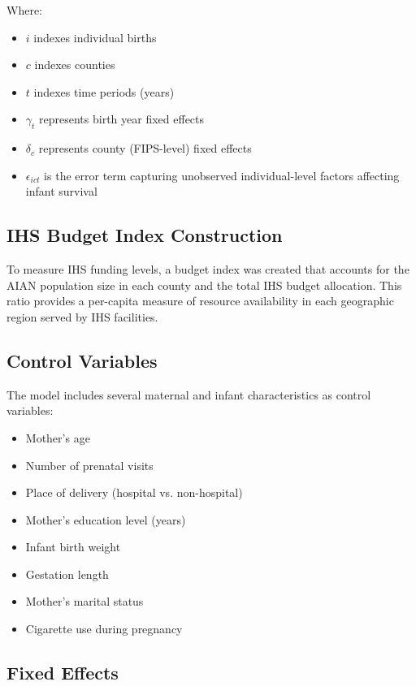 \documentclass[12pt]{article}
\begin{document}
Where:
\begin{itemize}
    \item $i$ indexes individual births
    \item $c$ indexes counties
    \item $t$ indexes time periods (years)
    \item $\gamma_t$ represents birth year fixed effects
    \item $\delta_c$ represents county (FIPS-level) fixed effects
    \item $\epsilon_{ict}$ is the error term capturing unobserved individual-level factors affecting infant survival
\end{itemize}

\subsection{IHS Budget Index Construction}

To measure IHS funding levels, a budget index was created that accounts for the AIAN population size in each county and the total IHS budget allocation. This ratio provides a per-capita measure of resource availability in each geographic region served by IHS facilities.

\subsection{Control Variables}

The model includes several maternal and infant characteristics as control variables:
\begin{itemize}
    \item Mother's age
    \item Number of prenatal visits
    \item Place of delivery (hospital vs. non-hospital)
    \item Mother's education level (years)
    \item Infant birth weight
    \item Gestation length
    \item Mother's marital status
    \item Cigarette use during pregnancy
\end{itemize}

\subsection{Fixed Effects}
\end{document}
